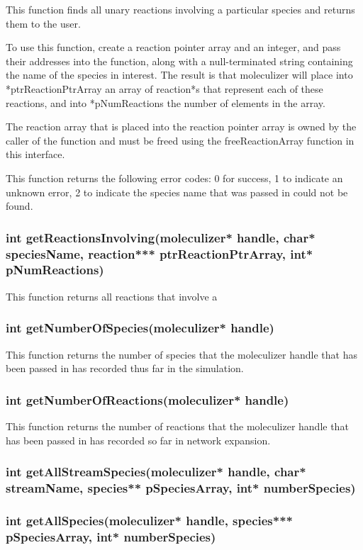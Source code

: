 This function finds all unary reactions involving a particular
species and returns them to the user.

To use this function, create a reaction pointer array and an integer,
and pass their addresses into the function, along with a
null-terminated string containing the name of the species in
interest.  The result is that moleculizer will place into
*ptrReactionPtrArray an array of reaction*s that represent each of
these reactions, and into *pNumReactions the number of elements in the array.

The reaction array that is placed into the reaction pointer array is
owned by the caller of the function and must be freed using the
freeReactionArray function in this interface.

This function returns the following error codes: 0 for success, 1 to
indicate an unknown error, 2 to indicate the species name that was
passed in could not be found.

\subsubsection{int getReactionsInvolving(moleculizer* handle, char*
  speciesName, reaction*** ptrReactionPtrArray, int* pNumReactions)}

This function returns all reactions that involve a 


\subsubsection{int getNumberOfSpecies(moleculizer* handle)}
This function returns the number of species that the moleculizer
handle that has been passed in has recorded thus far in the
simulation.

\subsubsection{int getNumberOfReactions(moleculizer* handle)}
This function returns the number of reactions that the moleculizer
handle that has been passed in has recorded so far in network expansion.

\subsubsection{int getAllStreamSpecies(moleculizer* handle, char*
  streamName, species** pSpeciesArray, int* numberSpecies)}


\subsubsection{int getAllSpecies(moleculizer* handle, species***
  pSpeciesArray, int* numberSpecies)}

